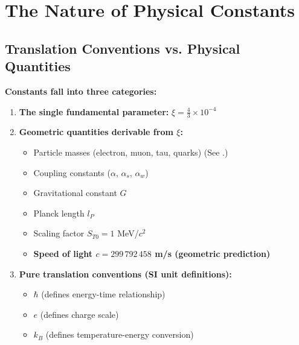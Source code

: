 	\section{The Nature of Physical Constants}
	
	\subsection{Translation Conventions vs. Physical Quantities}
	
	\begin{keyresult}
		\textbf{Constants fall into three categories:}
		\begin{enumerate}
			\item \textbf{The single fundamental parameter:} $\xi = \frac{4}{3} \times 10^{-4}$
			
			\item \textbf{Geometric quantities derivable from $\xi$:}
			\begin{itemize}
				\item Particle masses (electron, muon, tau, quarks) (See \cite{particle_masses_En}.)
				\item Coupling constants ($\alpha$, $\alpha_s$, $\alpha_w$)
				\item Gravitational constant $G$
				\item Planck length $l_P$
				\item Scaling factor $S_{T0} = 1$ MeV/$c^2$
				\item \textbf{Speed of light $c = 299\,792\,458$ m/s (geometric prediction)}
			\end{itemize}
			
			\item \textbf{Pure translation conventions (SI unit definitions):}
			\begin{itemize}
				\item $\hbar$ (defines energy-time relationship)
				\item $e$ (defines charge scale)
				\item $k_B$ (defines temperature-energy conversion)
			\end{itemize}
		\end{enumerate}
	\end{keyresult}
	
